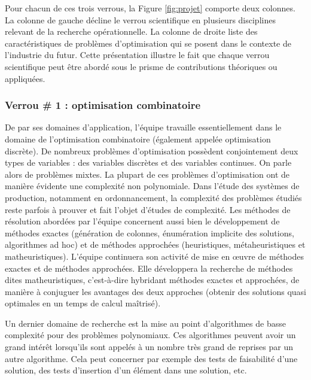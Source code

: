 	Pour chacun de ces trois verrous, la Figure \ref{fig:projet} comporte deux colonnes. La colonne de gauche décline le verrou scientifique en plusieurs disciplines relevant de la recherche opérationnelle. La colonne de droite liste des caractéristiques de problèmes d'optimisation qui se posent dans le contexte de l'industrie du futur. Cette présentation illustre le fait que chaque verrou scientifique peut être abordé sous le prisme de contributions théoriques ou appliquées. 
	
	
	\subsubsection*{Verrou \# 1 : optimisation combinatoire}
	
	De par ses domaines d'application, l'équipe travaille essentiellement dans le domaine de l'optimisation combinatoire (également appelée optimisation discrète). De nombreux problèmes d'optimisation possèdent conjointement deux types de variables : des variables discrètes et des variables continues. On parle alors de problèmes mixtes. La plupart de ces problèmes d'optimisation ont de manière évidente une complexité non polynomiale. Dans l'étude des systèmes de production, notamment en ordonnancement, la complexité des problèmes étudiés reste parfois à prouver et fait l'objet d'études de complexité. Les méthodes de résolution abordées par l'équipe concernent aussi bien le développement de méthodes exactes (génération de colonnes, énumération implicite des solutions, algorithmes ad hoc) et de méthodes approchées (heuristiques, métaheuristiques et matheuristiques). 
	L'équipe continuera son activité de mise en {\oe}uvre de méthodes exactes et de méthodes approchées. Elle développera la recherche de méthodes dites matheuristiques, c'est-à-dire hybridant méthodes exactes et approchées, de manière à conjuguer les avantages des deux approches (obtenir des solutions quasi optimales en un temps de calcul maîtrisé).
	
	Un dernier domaine de recherche est la mise au point d'algorithmes de basse complexité pour des problèmes polynomiaux. Ces algorithmes peuvent avoir un grand intérêt lorsqu'ils sont appelés à un nombre très grand de reprises par un autre algorithme. Cela peut concerner par exemple des tests de faisabilité d'une solution, des tests d'insertion d'un élément dans une solution, etc.
	
